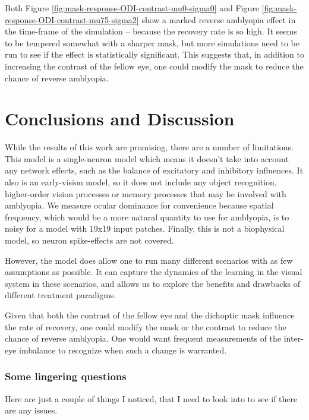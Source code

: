 \documentclass[
  sn-apa,
  pdflatex]{sn-jnl}
\theoremstyle{thmstyleone}%
\theoremstyle{thmstyletwo}%
\theoremstyle{thmstylethree}%
\begin{document}
Both Figure \ref{fig:mask-response-ODI-contrast-mu0-sigma0} and Figure
\ref{fig:mask-response-ODI-contrast-mu75-sigma2} show a marked reverse
amblyopia effect in the time-frame of the simulation -- because the
recovery rate is so high. It seems to be tempered somewhat with a
sharper mask, but more simulations need to be run to see if the effect
is statistically significant. This suggests that, in addition to
increasing the contrast of the fellow eye, one could modify the mask to
reduce the chance of reverse amblyopia.

\hypertarget{conclusions-and-discussion}{%
\section{Conclusions and Discussion}\label{conclusions-and-discussion}}

While the results of this work are promising, there are a number of
limitations. This model is a single-neuron model which means it doesn't
take into account any network effects, such as the balance of excitatory
and inhibitory influences. It also is an early-vision model, so it does
not include any object recognition, higher-order vision processes or
memory processes that may be involved with amblyopia. We measure ocular
dominance for convenience because spatial frequency, which would be a
more natural quantity to use for amblyopia, is to noisy for a model with
19x19 input patches. Finally, this is not a biophysical model, so neuron
spike-effects are not covered.

However, the model does allow one to run many different scenarios with
as few assumptions as possible. It can capture the dynamics of the
learning in the visual system in these scenarios, and allows us to
explore the benefits and drawbacks of different treatment paradigms.

Given that both the contrast of the fellow eye and the dichoptic mask
influence the rate of recovery, one could modify the mask or the
contrast to reduce the chance of reverse amblyopia. One would want
frequent measurements of the inter-eye imbalance to recognize when such
a change is warranted.

\hypertarget{some-lingering-questions}{%
\subsubsection{Some lingering
questions}\label{some-lingering-questions}}

Here are just a couple of things I noticed, that I need to look into to
see if there are any issues.
\end{document}
